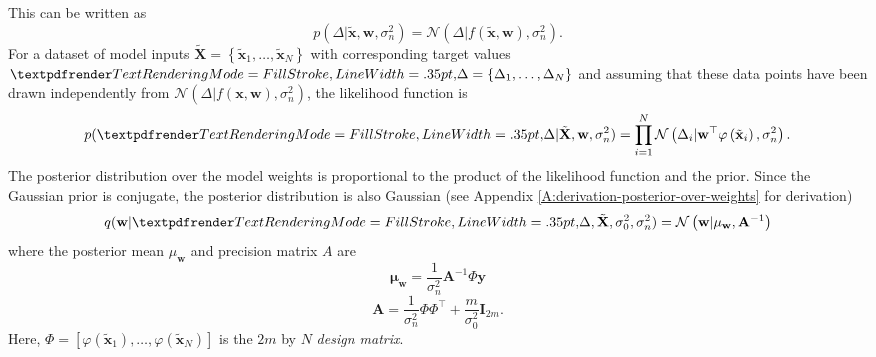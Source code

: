 This can be written as 
\begin{equation}
    p(\Delta  | \tilde{\mathbf{x}}, \mathbf{w}, \sigma^{2}_{n})= \mathcal{N}\left(\Delta | f(\tilde{\mathbf{x}}, \mathbf{w}), \sigma^{2}_{n}\right).
    \label{Eq:Model-one-value-likelihood}
\end{equation}
For a dataset of model inputs $\tilde{\mathbf{X}}=\left\{\tilde{\mathbf{x}}_{1}, \dots, \tilde{\mathbf{x}}_{N}\right\}$ with corresponding target values $\boldgreek{\Delta}=\{\Delta_{1}, \dots, \Delta_{N}\}$ and assuming that these data points have been drawn independently from $\mathcal{N}(\Delta|f(\mathbf{x}, \mathbf{w}), \sigma^{2}_{n})$, the likelihood function is
\begin{equation}
    p(\boldgreek{\Delta} | \tilde{\mathbf{X}}, \mathbf{w}, \sigma^{2}_{n})=\prod_{i=1}^{N} \mathcal{N}\left(\Delta_{i} | \mathbf{w}^{\top} \varphi\left(\tilde{\mathbf{x}}_{i}\right), \sigma^{2}_{n}\right).
\end{equation}
The posterior distribution over the model weights is proportional to the product of the likelihood function and the prior. Since the Gaussian prior is conjugate, the posterior distribution is also Gaussian (see Appendix \ref{A:derivation-posterior-over-weights} for derivation)
\begin{equation}
    q(\mathbf{w} | \boldgreek{\Delta}, \tilde{\mathbf{X}}, \sigma_{0}^{2}, \sigma_{n}^{2})=\mathcal{N}\left(\mathbf{w} | \mathbf{\mu_{\mathbf{w}}}, \mathbf{A}^{-1}\right)
    \label{Eq:Model-posterior-over-weights}
\end{equation}
where the posterior mean $\mu_{\mathbf{w}}$ and precision matrix $A$ are
\begin{equation}
    \mathbf{\mu_{\mathbf{w}}}=\frac{1}{\sigma_{n}^{2}} \mathbf{A}^{-1} \Phi \mathbf{y}
\end{equation}
\begin{equation}
    \mathbf{A} =\frac{1}{\sigma_{n}^{2}} \Phi \Phi^{\top} + \frac{m}{\sigma_{0}^{2}} \mathbf{I}_{2m}.
\end{equation}
Here, $\Phi = \left[\varphi(\tilde{\mathbf{x}}_{1}), \dots , \varphi(\tilde{\mathbf{x}}_{N})\right]$ is the $2m$ by $N$ \textit{design matrix}.

